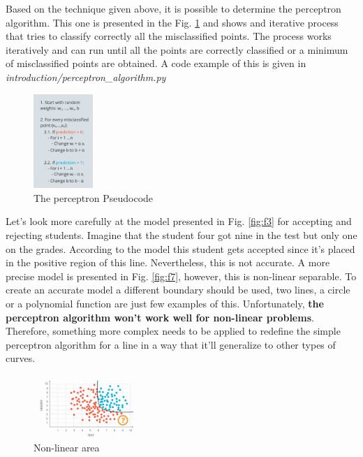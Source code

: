 \documentclass{article}
\begin{document}
Based on the technique given above, it is possible to determine the perceptron algorithm. This one is presented in the Fig. \ref{fig:f16} and shows and iterative process that tries to classify correctly all the misclassified points. The process works iteratively and can run until all the points are correctly classified or a minimum of misclassified points are obtained. A code example of this is given in \textit{introduction/perceptron\_algorithm.py}
  
\begin{figure}[ht]
    \centering
    \includegraphics[width=0.2\textwidth,height=0.2\textheight,keepaspectratio]{images/perceotron_algorithm.png}
    \captionsetup{justification=centering}
    \caption{The perceptron Pseudocode}
    \label{fig:f16}
\end{figure}
  
Let's look more carefully at the model presented in Fig. \ref{fig:f3} for accepting and rejecting students. Imagine that the student four got nine in the test but only one on the grades. According to the model this student gets accepted since it's placed in the positive region of this line. Nevertheless, this is not accurate. A more precise model is presented in Fig. \ref{fig:f7}, however, this is non-linear separable. To create an accurate model a different boundary should be used, two lines, a circle or a polynomial function are just few examples of this. Unfortunately, \textbf{the perceptron algorithm won't work well for non-linear problems}. Therefore, something more complex needs to be applied to redefine the simple perceptron algorithm for a line in a way that it'll generalize to other types of curves.

\begin{figure}[ht]
    \centering
    \includegraphics[width=0.35\textwidth,height=0.35\textheight,keepaspectratio]{images/non_linear.png}
    \captionsetup{justification=centering}
    \caption{Non-linear area}
    \label{fig:f17}
\end{figure}
\end{document}
